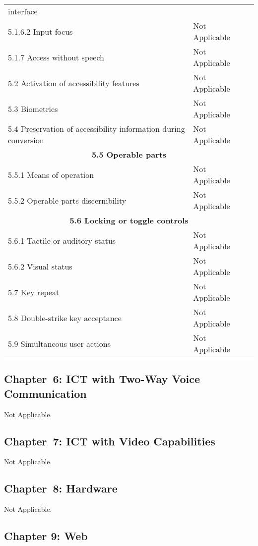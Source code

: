 \documentclass{report}
\begin{document}
\begin{longtable}{p{}<{\RaggedRight}p{}<{\RaggedRight}p{}<{\RaggedRight}}
{  interface}\\*
  5.1.6.2 Input focus & Not Applicable\\
  5.1.7 Access without speech & Not Applicable\\
  5.2 Activation of accessibility features & Not Applicable\\
  5.3 Biometrics & Not Applicable\\
  5.4 Preservation of accessibility information during conversion &
                                                                    Not Applicable\\
  \multicolumn{3}{c}{\bfseries 5.5 Operable parts}\\*
  5.5.1 Means of operation & Not Applicable\\
  5.5.2 Operable parts discernibility & Not Applicable\\
  \multicolumn{3}{c}{\bfseries 5.6 Locking or toggle controls}\\*
  5.6.1 Tactile or auditory status & Not Applicable\\
  5.6.2 Visual status & Not Applicable\\
  5.7 Key repeat & Not Applicable\\
  5.8 Double-strike key acceptance & Not Applicable\\
  5.9 Simultaneous user actions & Not Applicable\\
\end{longtable}

\subsection{Chapter~6: ICT with Two-Way Voice Communication }
\label{sec:EN301-6}

Not Applicable.

\subsection{Chapter~7: ICT with Video Capabilities }
\label{sec:EN301-7}

Not Applicable.


\subsection{Chapter~8: Hardware}
\label{sec:EN301-8}

Not Applicable.

\subsection{Chapter 9: Web}
\label{sec:EN301-9}
\end{document}
